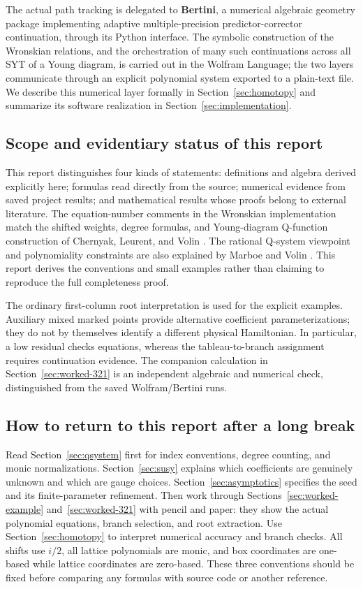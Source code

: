 \documentclass[11pt]{article}
\begin{document}
The actual path tracking is delegated to \textbf{Bertini}, a numerical
algebraic geometry package implementing adaptive multiple-precision
predictor-corrector continuation, through its Python interface. The
symbolic construction of the Wronskian relations, and the orchestration of
many such continuations across all SYT of a Young diagram, is carried out
in the Wolfram Language; the two layers communicate through an explicit
polynomial system exported to a plain-text file. We describe this
numerical layer formally in Section~\ref{sec:homotopy} and summarize its
software realization in Section~\ref{sec:implementation}.

\subsection{Scope and evidentiary status of this report}

This report distinguishes four kinds of statements: definitions and
algebra derived explicitly here; formulas read directly from the source;
numerical evidence from saved project results; and mathematical results
whose proofs belong to external literature. The equation-number comments
in the Wronskian implementation match the shifted weights, degree
formulas, and Young-diagram Q-function construction of Chernyak,
Leurent, and Volin \cite{chervolin}. The rational Q-system viewpoint and
polynomiality constraints are also explained by Marboe and Volin
\cite{marboevolin}. This report derives the conventions and small examples
rather than claiming to reproduce the full completeness proof.

The ordinary first-column root interpretation is used for the explicit
examples. Auxiliary mixed marked points provide alternative coefficient
parameterizations; they do not by themselves identify a different
physical Hamiltonian. In particular, a low residual checks equations,
whereas the tableau-to-branch assignment requires continuation evidence.
The companion calculation in Section~\ref{sec:worked-321} is an
independent algebraic and numerical check, distinguished from the saved
Wolfram/Bertini runs.

\subsection{How to return to this report after a long break}

Read Section~\ref{sec:qsystem} first for index conventions, degree
counting, and monic normalizations. Section~\ref{sec:susy} explains which
coefficients are genuinely unknown and which are gauge choices.
Section~\ref{sec:asymptotics} specifies the seed and its finite-parameter
refinement. Then work through Sections~\ref{sec:worked-example}
and~\ref{sec:worked-321} with pencil and paper: they show the actual
polynomial equations, branch selection, and root extraction.
Use Section~\ref{sec:homotopy} to interpret numerical accuracy and branch
checks. All shifts use $i/2$, all lattice polynomials are monic, and box
coordinates are one-based while lattice coordinates are zero-based.
These three conventions should be fixed before comparing any formulas
with source code or another reference.
\end{document}
